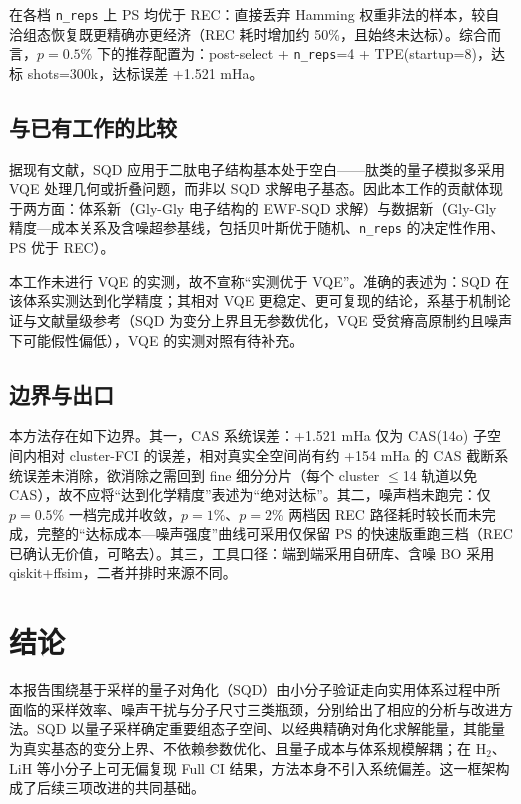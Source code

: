 \documentclass[UTF8,12pt,a4paper]{ctexart}
\newcommand{\Htwo}{H$_2$}
\begin{document}
在各档 \texttt{n\_reps} 上 PS 均优于 REC：直接丢弃 Hamming 权重非法的样本，较自洽组态恢复既更精确亦更经济（REC 耗时增加约 50\%，且始终未达标）。综合而言，$p=0.5\%$ 下的推荐配置为：post-select + \texttt{n\_reps}=4 + TPE(startup=8)，达标 shots=300k，达标误差 +1.521 mHa。

\subsection{与已有工作的比较}

据现有文献，SQD 应用于二肽电子结构基本处于空白——肽类的量子模拟多采用 VQE 处理几何或折叠问题，而非以 SQD 求解电子基态。因此本工作的贡献体现于两方面：体系新（Gly-Gly 电子结构的 EWF-SQD 求解）与数据新（Gly-Gly 精度—成本关系及含噪超参基线，包括贝叶斯优于随机、\texttt{n\_reps} 的决定性作用、PS 优于 REC）。

本工作未进行 VQE 的实测，故不宣称``实测优于 VQE''。准确的表述为：SQD 在该体系实测达到化学精度；其相对 VQE 更稳定、更可复现的结论，系基于机制论证与文献量级参考（SQD 为变分上界且无参数优化，VQE 受贫瘠高原制约且噪声下可能假性偏低），VQE 的实测对照有待补充。

\subsection{边界与出口}

本方法存在如下边界。其一，CAS 系统误差：+1.521 mHa 仅为 CAS(14o) 子空间内相对 cluster-FCI 的误差，相对真实全空间尚有约 +154 mHa 的 CAS 截断系统误差未消除，欲消除之需回到 fine 细分分片（每个 cluster $\le$14 轨道以免 CAS），故不应将``达到化学精度''表述为``绝对达标''。其二，噪声档未跑完：仅 $p=0.5\%$ 一档完成并收敛，$p=1\%$、$p=2\%$ 两档因 REC 路径耗时较长而未完成，完整的``达标成本—噪声强度''曲线可采用仅保留 PS 的快速版重跑三档（REC 已确认无价值，可略去）。其三，工具口径：端到端采用自研库、含噪 BO 采用 qiskit+ffsim，二者并排时来源不同。

\section{结论}

本报告围绕基于采样的量子对角化（SQD）由小分子验证走向实用体系过程中所面临的采样效率、噪声干扰与分子尺寸三类瓶颈，分别给出了相应的分析与改进方法。SQD 以量子采样确定重要组态子空间、以经典精确对角化求解能量，其能量为真实基态的变分上界、不依赖参数优化、且量子成本与体系规模解耦；在 \Htwo{}、LiH 等小分子上可无偏复现 Full CI 结果，方法本身不引入系统偏差。这一框架构成了后续三项改进的共同基础。
\end{document}
